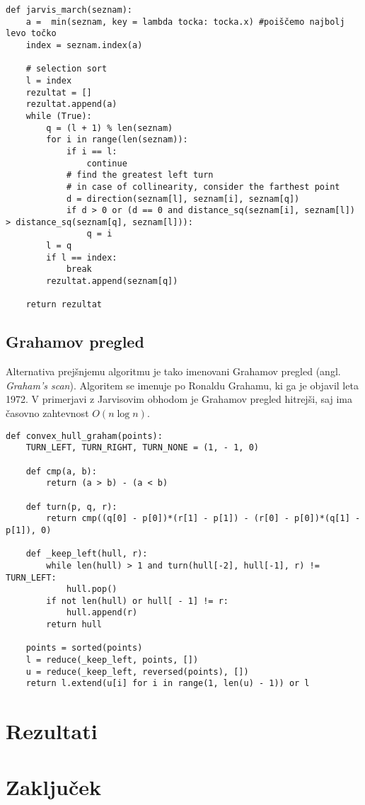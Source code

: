 \documentclass[a4paper]{article}
\begin{document}
\begin{lstlisting}
def jarvis_march(seznam):
    a =  min(seznam, key = lambda tocka: tocka.x) #poiščemo najbolj levo točko
    index = seznam.index(a)
    
    # selection sort
    l = index
    rezultat = []
    rezultat.append(a)
    while (True):
        q = (l + 1) % len(seznam)
        for i in range(len(seznam)):
            if i == l:
                continue
            # find the greatest left turn
            # in case of collinearity, consider the farthest point
            d = direction(seznam[l], seznam[i], seznam[q])
            if d > 0 or (d == 0 and distance_sq(seznam[i], seznam[l]) > distance_sq(seznam[q], seznam[l])):
                q = i
        l = q
        if l == index:
            break
        rezultat.append(seznam[q])

    return rezultat
\end{lstlisting}


\subsection{Grahamov pregled}
Alternativa prejšnjemu algoritmu je tako imenovani Grahamov pregled (angl. \textit{Graham's scan}). Algoritem se imenuje po Ronaldu Grahamu, ki ga je objavil leta 1972. V primerjavi z Jarvisovim obhodom je Grahamov pregled hitrejši, saj ima časovno zahtevnost $O(n \log n)$.

\begin{lstlisting}
def convex_hull_graham(points):
    TURN_LEFT, TURN_RIGHT, TURN_NONE = (1, - 1, 0)

    def cmp(a, b):
        return (a > b) - (a < b)

    def turn(p, q, r):
        return cmp((q[0] - p[0])*(r[1] - p[1]) - (r[0] - p[0])*(q[1] - p[1]), 0)

    def _keep_left(hull, r):
        while len(hull) > 1 and turn(hull[-2], hull[-1], r) != TURN_LEFT:
            hull.pop()
        if not len(hull) or hull[ - 1] != r:
            hull.append(r)
        return hull

    points = sorted(points)
    l = reduce(_keep_left, points, [])
    u = reduce(_keep_left, reversed(points), [])
    return l.extend(u[i] for i in range(1, len(u) - 1)) or l
\end{lstlisting}





\section{Rezultati}

\section{Zaključek}
\end{document}
